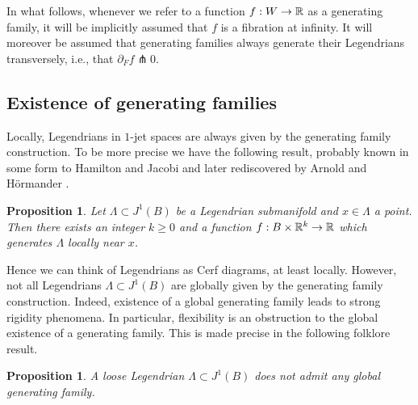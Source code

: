 \documentclass[11pt]{article}
\newcommand{\ie}{i.e.,\xspace}
\numberwithin{equation}{section}\providecommand{\dpl}{\displaystyle}
\theoremstyle{plain}
\newtheorem{proposition}[theorem]{Proposition}
\theoremstyle{definition}
\begin{document}
In what follows, whenever we refer to a function $f:W \to \mathbb{R}$ as a generating family, it will be implicitly assumed that $f$ is a fibration at infinity. It will moreover be assumed that generating families always generate their Legendrians transversely, \ie that $\partial_F f \pitchfork 0$.

\subsection{Existence of generating families}

Locally, Legendrians in $1$-jet spaces are always given by the generating family construction. To be more precise we have the following result, probably known in some form to Hamilton and Jacobi and later rediscovered by Arnold and Hörmander \cite{AGV85}.

\begin{proposition}
Let $\Lambda \subset J^1(B)$ be a Legendrian submanifold and $x \in \Lambda$ a point. Then there exists an integer $k \geq 0$ and a function $f: B \times \mathbb{R}^k \to \mathbb{R}$ which generates $\Lambda$ locally near $x$.
\end{proposition}

Hence we can think of Legendrians as Cerf diagrams, at least locally. However, not all Legendrians $\Lambda \subset J^1(B)$ are globally given by the generating family construction. Indeed, existence of a global generating family leads to strong rigidity phenomena. In particular, flexibility is an obstruction to the global existence of a generating family. This is made precise in the following folklore result.

\begin{proposition}\label{Proposition: global non-existence} A loose Legendrian $\Lambda \subset J^1(B)$ does not admit any global generating family.
\end{proposition}
\end{document}

